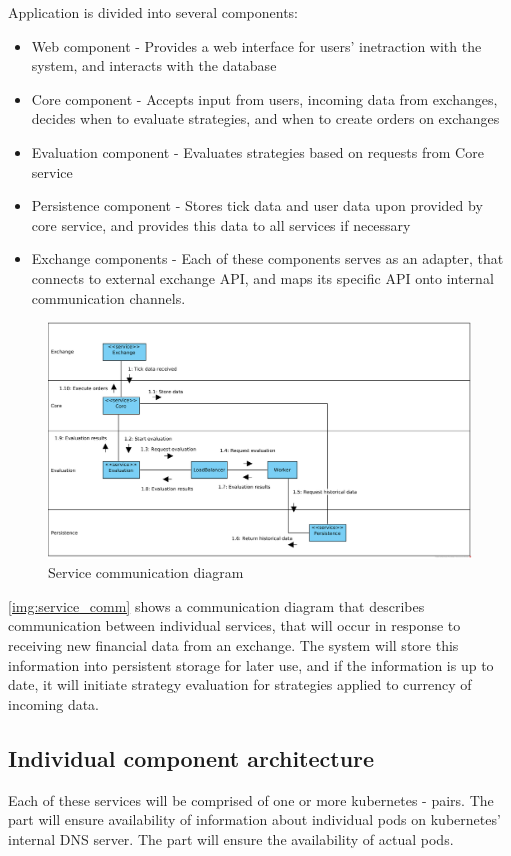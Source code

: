 Application is divided into several components:
\begin{itemize}
    \item Web component - Provides a web interface for users' inetraction with the system, and interacts with the database
    \item Core component - Accepts input from users, incoming data from exchanges, decides when to evaluate strategies, and when to create orders on exchanges
    \item Evaluation component - Evaluates strategies based on requests from Core service
    \item Persistence component - Stores tick data and user data upon provided by core service, and provides this data to all services if necessary
    \item Exchange components - Each of these components serves as an adapter, that connects to external exchange API, and
    maps its specific API onto internal communication channels.
\end{itemize}

\begin{figure}[H]
    \includegraphics[width=\textwidth]{obrazky-figures/serv_comm.png}
    \caption{Service communication diagram}
    \label{img:service_comm}
\end{figure}

\autoref{img:service_comm} shows a communication diagram that describes communication between individual services, that
will occur in response to receiving new financial data from an exchange. The system will store this information
into persistent storage for later use, and if the information is up to date, it will initiate strategy evaluation
for strategies applied to currency of incoming data.

\subsection{Individual component architecture}
Each of these services will be comprised of one or more kubernetes - pairs. The
 part will ensure availability of information about individual pods on kubernetes' internal DNS server.
The  part will ensure the availability of actual pods.

